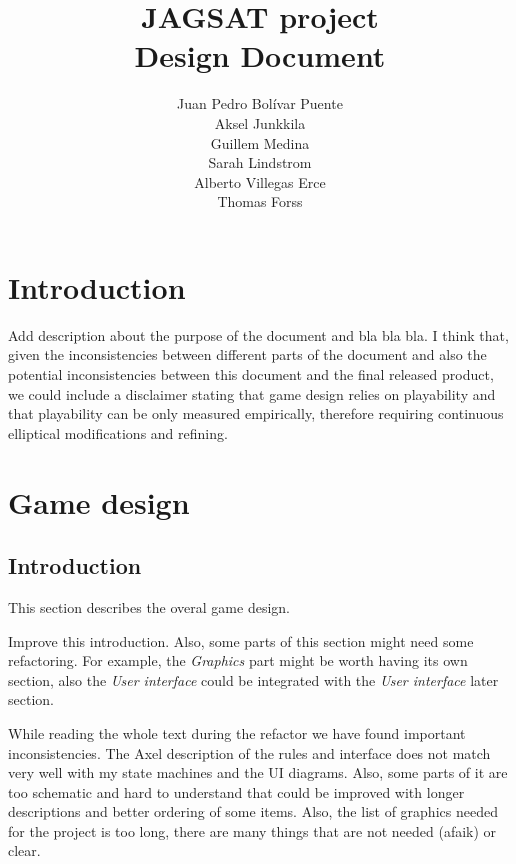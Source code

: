 \documentclass[12pt,a4paper]{article}
\title{\large JAGSAT project\\\huge Design Document}
\author{
  Juan Pedro Bolívar Puente\\ 
  Aksel Junkkila\\
  Guillem Medina\\ 
  Sarah Lindstrom\\ 
  Alberto Villegas Erce\\ 
  Thomas Forss
}
\let\stdsection\section
\renewcommand\section{\newpage\stdsection}
\begin{document}
\maketitle

\tableofcontents
\pagebreak

\section{Introduction}

\begin{todo}
  Add description about the purpose of the document and bla bla bla. I
  think that, given the inconsistencies between different parts of the
  document and also the potential inconsistencies between this
  document and the final released product, we could include a
  disclaimer stating that game design relies on playability and that
  playability can be only measured empirically, therefore requiring
  continuous elliptical modifications and refining. 
\end{todo}

\section{Game design}

\subsection{Introduction}

This section describes the overal game design.

\begin{todo}
  Improve this introduction. Also, some parts of this section might need
  some refactoring. For example, the \emph{Graphics} part might be worth
  having its own section, also the \emph{User interface} could be
  integrated with the \emph{User interface} later section.
\end{todo}

\begin{todo}
  While reading the whole text during the refactor we have found
  important inconsistencies. The Axel description of the rules and
  interface does not match very well with my state machines and the UI
  diagrams. Also, some parts of it are too schematic and hard to
  understand that could be improved with longer descriptions and better
  ordering of some items. Also, the list of graphics needed for the
  project is too long, there are many things that are not needed (afaik)
  or clear.
\end{todo}
\end{document}
